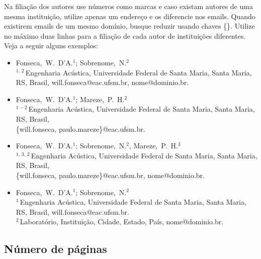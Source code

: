Na filiação dos autores use números como marcas e caso existam autores de uma mesma instituição, utilize apenas um endereço e os diferencie nos emails. Quando existirem emails de um mesmo domínio, busque reduzir usando chaves \{\}. Utilize no máximo duas linhas para a filiação de cada autor de instituições diferentes. Veja a seguir alguns  exemplos:
%
\begin{flushleft}
\vspace{-0.25\baselineskip}
\begin{itemize}[topsep=-1ex,align=left,leftmargin=0.2cm] \itemsep=4pt

	\item Fonseca,~W.~D'A.$^1$; Sobrenome,~N.$^2$\\[6pt]	
	$^{1,\,2}$\,Engenharia Acústica, Universidade Federal de Santa Maria, Santa Maria, RS, Brasil, 
	 will.fonseca@eac.ufsm.br, nome@dominio.br.
	
	\item Fonseca,~W.~D'A.$^1$; Mareze,~P.~H.$^2$\\[6pt]	
	$^{1-2}$\,Engenharia Acústica, Universidade Federal de Santa Maria, Santa Maria, RS, Brasil,\\
	\{will.fonseca, paulo.mareze\}@eac.ufsm.br.
	
	\item Fonseca,~W.~D'A.$^1$; Sobrenome,~N.$^2$, Mareze,~P.~H.$^3$\\[6pt]	
	$^{1,\,3,\,2}$\,Engenharia Acústica, Universidade Federal de Santa Maria, Santa Maria, RS, Brasil,\\
	\{will.fonseca, paulo.mareze\}@eac.ufsm.br, nome@dominio.br.

	\item Fonseca,~W.~D'A.$^1$; Sobrenome,~N.$^2$\\[6pt]	
	$^{1}$\,Engenharia Acústica, Universidade Federal de Santa Maria, Santa Maria, RS, Brasil,
	will.fonseca@eac.ufsm.br.\\[4pt]		
	$^2$\,Laboratório, Instituição, Cidade, Estado, País, nome@dominio.br.	
\end{itemize}
\vspace{-0.4\baselineskip}
\end{flushleft}

	
\subsection{Número de páginas}


